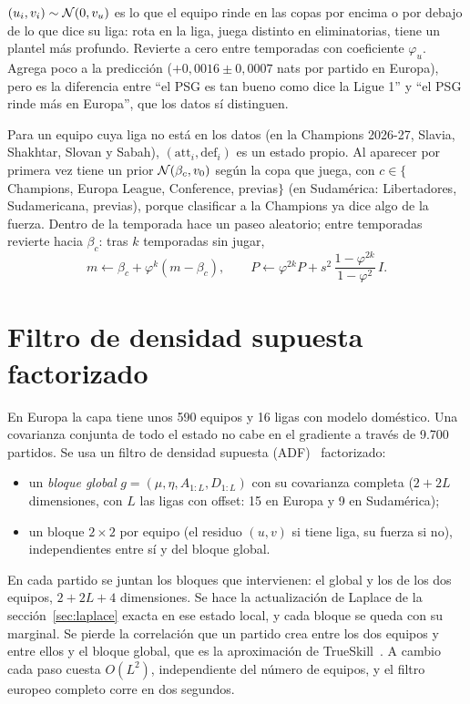  $(u_i,v_i)\sim\mathcal{N}(0,v_u)$ es lo que el equipo rinde en las copas por encima o por debajo de lo que dice su liga: rota en la liga, juega distinto en eliminatorias, tiene un plantel más profundo. Revierte a cero entre temporadas con coeficiente $\varphi_u$. Agrega poco a la predicción ($+0{,}0016\pm0{,}0007$ nats por partido en Europa), pero es la diferencia entre ``el PSG es tan bueno como dice la Ligue 1'' y ``el PSG rinde más en Europa'', que los datos sí distinguen.

 Para un equipo cuya liga no está en los datos (en la Champions 2026-27, Slavia, Shakhtar, Slovan y Sabah), $(\text{att}_i,\text{def}_i)$ es un estado propio. Al aparecer por primera vez tiene un prior $\mathcal{N}(\beta_c,v_0)$ según la copa que juega, con $c\in\{$Champions, Europa League, Conference, previas$\}$ (en Sudamérica: Libertadores, Sudamericana, previas), porque clasificar a la Champions ya dice algo de la fuerza. Dentro de la temporada hace un paseo aleatorio; entre temporadas revierte hacia $\beta_c$: tras $k$ temporadas sin jugar,
\[
m\leftarrow\beta_c+\varphi^k(m-\beta_c),\qquad P\leftarrow\varphi^{2k}P+s^2\,\frac{1-\varphi^{2k}}{1-\varphi^2}\,I.
\]

\section{Filtro de densidad supuesta factorizado}

En Europa la capa tiene unos 590 equipos y 16 ligas con modelo doméstico. Una covarianza conjunta de todo el estado no cabe en el gradiente a través de 9.700 partidos. Se usa un filtro de densidad supuesta (ADF)~\cite{minka2001} factorizado:

\begin{itemize}
\item un \emph{bloque global} $g=(\mu,\eta,A_{1:L},D_{1:L})$ con su covarianza completa ($2+2L$ dimensiones, con $L$ las ligas con offset: 15 en Europa y 9 en Sudamérica);
\item un bloque $2\times2$ por equipo (el residuo $(u,v)$ si tiene liga, su fuerza si no), independientes entre sí y del bloque global.
\end{itemize}

En cada partido se juntan los bloques que intervienen: el global y los de los dos equipos, $2+2L+4$ dimensiones. Se hace la actualización de Laplace de la sección~\ref{sec:laplace} exacta en ese estado local, y cada bloque se queda con su marginal. Se pierde la correlación que un partido crea entre los dos equipos y entre ellos y el bloque global, que es la aproximación de TrueSkill~\cite{herbrich2007}. A cambio cada paso cuesta $O(L^2)$, independiente del número de equipos, y el filtro europeo completo corre en dos segundos.

